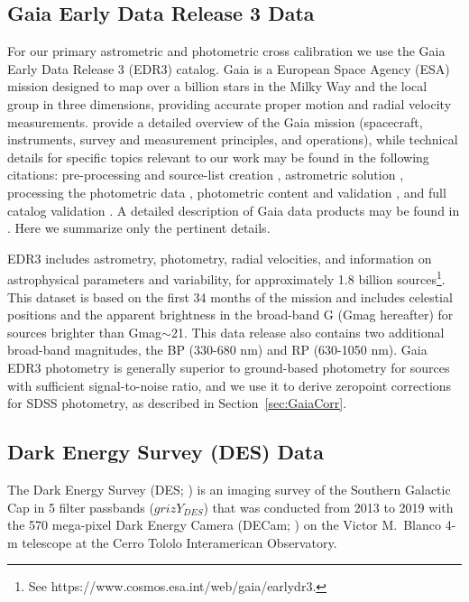 \documentclass[fleqn,usenatbib]{mnras}
\begin{document}
\subsection{Gaia Early Data Release 3 Data} \label{ssec:gaia}
 
For our primary astrometric and photometric cross calibration we use the Gaia Early Data Release 3 (EDR3) catalog.  Gaia is a European Space Agency (ESA) mission designed to map over a billion stars in the Milky Way and the local group in three dimensions, providing accurate proper motion and radial velocity measurements. \citet{GaiaCollab2016} provide a detailed overview of the Gaia mission (spacecraft, instruments, survey and measurement principles, and operations), while technical details for specific topics relevant to our work may be found in the following citations: pre-processing and source-list creation \citep{Fabr2016}, astrometric solution \citep{LInd2018}, processing the photometric data \citep{Riel2018}, photometric content and validation \citep{Evan2018}, and full catalog validation \citep{Aren2018}. A detailed description of Gaia data products  
may be found in \citet{GaiaCollab2018b}. Here we summarize only the pertinent details.

EDR3 includes astrometry, photometry, radial velocities, and information on astrophysical parameters and variability, for approximately 1.8 billion sources\footnote{See https://www.cosmos.esa.int/web/gaia/earlydr3.}. This dataset is based on the first 34 months of the mission and includes celestial positions and the apparent brightness in the broad-band G (Gmag hereafter) for sources brighter than Gmag$\sim$21.  This data release also contains two additional broad-band magnitudes, the BP (330-680 nm) and RP (630-1050 nm). Gaia EDR3 photometry is generally superior to ground-based photometry for sources with sufficient signal-to-noise ratio, and we use it to derive zeropoint corrections for SDSS photometry, as described in Section~\ref{sec:GaiaCorr}. 
 

\subsection{Dark Energy Survey (DES) Data} \label{ssec:des}


The Dark Energy Survey (DES; \citealt{2016MNRAS.460.1270D}) is an imaging survey of the Southern Galactic Cap in 5 filter passbands ($grizY_{DES}$) that was conducted from 2013 to 2019 with the 570 mega-pixel Dark Energy Camera (DECam;
\citealt{2008arXiv0810.3600H,2015AJ....150..150F}) on the Victor M.\ Blanco 4-m telescope at the Cerro Tololo Interamerican
Observatory.
\end{document}
